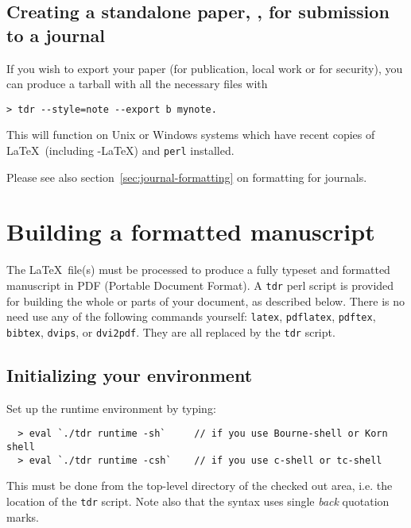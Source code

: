 \subsection{Creating a standalone paper, \eg, for submission to a journal}

If you wish to export your paper (for publication, local work or for security),
you can produce a tarball with all the necessary files with
\vspace*{-2.5ex}\begin{verbatim}
> tdr --style=note --export b mynote.
\end{verbatim}
This will function on  Unix or Windows systems which have
recent copies of \LaTeX\ (including \AmS-\LaTeX) and \texttt{perl} installed.

Please see also section~\ref{sec:journal-formatting} on formatting for journals.


\clearpage
\section{Building a formatted manuscript\label{tdr}}

The \LaTeX\ file(s) must be processed to produce a
fully typeset and formatted manuscript in PDF (Portable Document Format).
A \texttt{tdr} perl script is provided for building the whole or
parts of your document, as described below.
There is no need use any of the following commands yourself:
\texttt{latex},
\texttt{pdflatex},
\texttt{pdftex},
\texttt{bibtex},
\texttt{dvips}, or
\texttt{dvi2pdf}.
They are all replaced by the \texttt{tdr} script.


\subsection{Initializing your environment}
%
Set up the runtime environment by typing:
%
\vspace*{-2.5ex}\begin{verbatim}
  > eval `./tdr runtime -sh`     // if you use Bourne-shell or Korn shell
  > eval `./tdr runtime -csh`    // if you use c-shell or tc-shell
\end{verbatim}
%
This must be done from the top-level directory of the checked out
area, i.e. the location of the \texttt{tdr} script.
Note also that the syntax uses single \emph{back} quotation marks.

